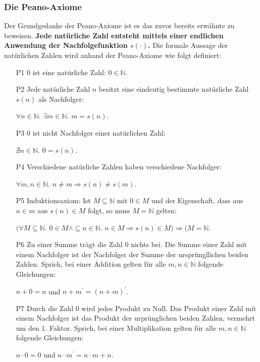 \documentclass[12pt,a4paper]{article}
\theoremstyle{definition}
\begin{document}
\subsubsection{Die Peano-Axiome}\label{Die Peano-Axiome}
Der Grundgedanke der Peano-Axiome ist es das zuvor bereits erwähnte zu beweisen.
\textbf{Jede natürliche Zahl entsteht mittels einer endlichen Anwendung der Nachfolgefunktion $s(\cdot)$.}\newline
Die formale Aussage der natürlichen Zahlen wird anhand der Peano-Axiome wie folgt definiert:
\begin{itemize}
\item [P1] 0 ist eine natürliche Zahl: $0 \in \mathbb{N}$.
\item [P2] Jede natürliche Zahl $n$ besitzt eine eindeutig bestimmte natürliche Zahl $s(n)$ als Nachfolger:
\begin{center}
$\forall n \in \mathbb{N}$. $\exists m \in \mathbb{N}$. $m = s(n)$.
\end{center}
\item [P3] 0 ist nicht Nachfolger einer natürlichen Zahl:
\begin{center}
$\nexists n \in \mathbb{N}$. $0 = s(n)$.
\end{center}
\item [P4] Verschiedene natürliche Zahlen haben verschiedene Nachfolger:
\begin{center}
$\forall m, n \in \mathbb{N}$. $n \neq m \Rightarrow s(n) \neq s(m)$.
\end{center}
\item [P5] Induktionsaxiom: Ist $M \subseteq \mathbb{N}$ mit $0 \in M$ und der Eigenschaft, dass aus $n \in m$ aus $s(n) \in M$ folgt, so muss $M = \mathbb{N}$ gelten:
\begin{center}
$(\forall M \subseteq \mathbb{N}$. $0 \in M \land \subseteq n \in \mathbb{N}$. $n \in M \Rightarrow s(n) \in M) \Rightarrow (M = \mathbb{N}$.
\end{center}
\item [P6] Zu einer Summe trägt die Zahl 0 nichts bei.
Die Summe einer Zahl mit einem Nachfolger ist der Nachfolger der Summe der ursprüngllichen beiden Zahlen.
Sprich, bei einer Addition gelten für alle $m, n \in \mathbb{N}$ folgende Gleichungen:
\begin{center}
$n + 0 = n$ und $n + m^\prime = (n + m)^\prime$.
\end{center}
\item [P7] Durch die Zahl 0 wird jedes Produkt zu Null.
Das Produkt einer Zahl mit einem Nachfolger ist das Produkt der urprünglichen beiden Zahlen, vermehrt um den 1. Faktor.
Sprich, bei einer Multiplikation gelten für alle $m, n \in \mathbb{N}$ folgende Gleichungen:
\begin{center}
$n \cdot 0 = 0$ und $n \cdot m^\prime = n \cdot m + n$.
\end{center}

\end{itemize}
\end{document}

